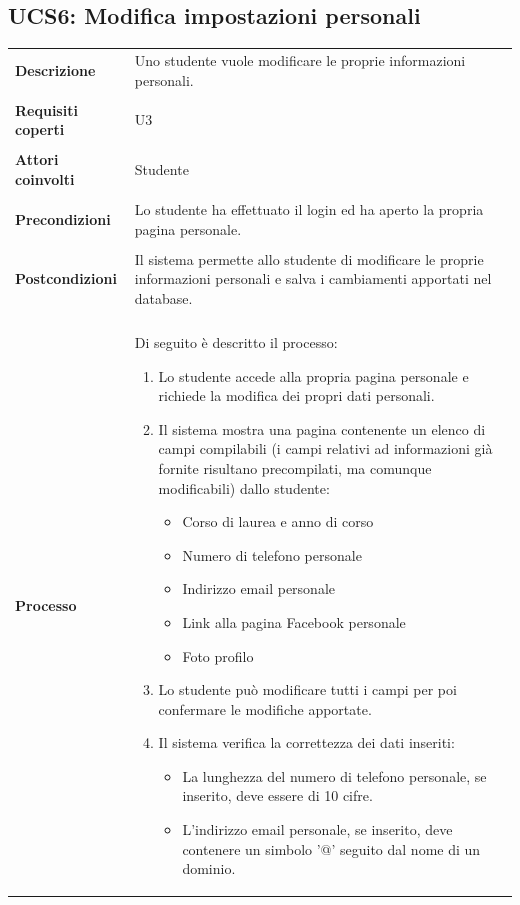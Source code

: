 \documentclass[10pt,a4paper]{report}
\begin{document}
	\subsection{UCS6: Modifica impostazioni personali}
	\begin{tabular}{lp{}}
		\textbf{Descrizione}&Uno studente vuole modificare le proprie informazioni personali.\\
		\\
		\textbf{Requisiti coperti}&U3\\
		\\
		\textbf{Attori coinvolti}&Studente\\
		\\
		\textbf{Precondizioni}&Lo studente ha effettuato il login ed ha aperto la propria pagina personale.\\
		\\
		\textbf{Postcondizioni}&Il sistema permette allo studente di modificare le proprie informazioni personali e salva i cambiamenti apportati nel database.\\
		\\
		\textbf{Processo}&Di seguito è descritto il processo:
		\begin{enumerate}
			\item Lo studente accede alla propria pagina personale e richiede la modifica dei propri dati personali.
			\item Il sistema mostra una pagina contenente un elenco di campi compilabili (i campi relativi ad informazioni già fornite risultano precompilati, ma comunque modificabili) dallo studente:
			\begin{itemize}
				\item Corso di laurea e anno di corso
				\item Numero di telefono personale
				\item Indirizzo email personale
				\item Link alla pagina Facebook personale
				\item Foto profilo
			\end{itemize}
			\item Lo studente può modificare tutti i campi per poi confermare le modifiche apportate.
			\item Il sistema verifica la correttezza dei dati inseriti:
			\begin{itemize}
				\item La lunghezza del numero di telefono personale, se inserito, deve essere di 10 cifre.
				\item L'indirizzo email personale, se inserito, deve contenere un simbolo '@' seguito dal nome di un dominio.

\end{itemize}
\end{enumerate}
\end{tabular}
\end{document}
